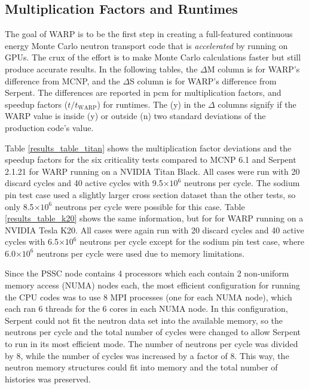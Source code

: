 \documentclass[preprint,12pt]{elsarticle}
\begin{document}
\subsection{Multiplication Factors and Runtimes}

The goal of WARP is to be the first step in creating a full-featured continuous energy Monte Carlo neutron transport code that is \emph{accelerated} by running on GPUs.  The crux of the effort is to make Monte Carlo calculations faster but still produce accurate results.  In the following tables, the $\Delta$M column is for WARP's difference from MCNP, and the $\Delta$S column is for WARP's difference from Serpent.  The differences are reported in pcm for multiplication factors, and speedup factors ($t/t_\mathrm{WARP}$) for runtimes.  The (y) in the $\Delta$ columns signify if the WARP value is inside (y) or outside (n) two standard deviations of the production code's value. 

Table \ref{results_table_titan} shows the multiplication factor deviations and the speedup factors for the six criticality tests compared to MCNP 6.1 and Serpent 2.1.21 for WARP running on a NVIDIA Titan Black.   All cases were run with 20 discard cycles and 40 active cycles with 9.5$\times10^{6}$ neutrons per cycle.  The sodium pin test case used a slightly larger cross section dataset than the other tests, so only 8.5$\times10^{6}$ neutrons per cycle were possible for this case.  Table  \ref{results_table_k20} shows the same information, but for for WARP running on a NVIDIA Tesla K20.  All cases were again run with 20 discard cycles and 40 active cycles with 6.5$\times10^{6}$ neutrons per cycle except for the sodium pin test case, where 6.0$\times10^{6}$ neutrons per cycle were used due to memory limitations.

Since the PSSC node contains 4 processors which each contain 2 non-uniform memory access (NUMA) nodes each, the most efficient configuration for running the CPU codes was to use 8 MPI processes (one for each NUMA node), which each ran 6 threads for the 6 cores in each NUMA node.  In this configuration, Serpent could not fit the neutron data set into the available memory, so the neutrons per cycle and the total number of cycles were changed to allow Serpent to run in its most efficient mode.  The number of neutrons per cycle was divided by 8, while the number of cycles was increased by a factor of 8.  This way, the neutron memory structures could fit into memory and the total number of histories was preserved.
\end{document}
